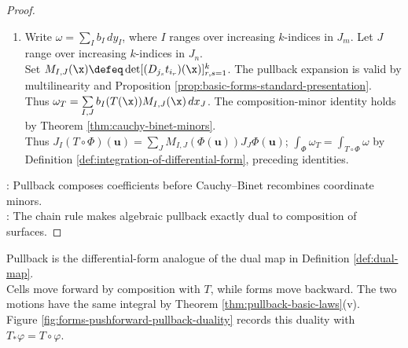 \begin{theorem}
\begin{proof}
\begin{enumerate}[label=(\roman*)]
\item Write $\omega=\sum\limits_I b_I\,dy_I$, where $I$ ranges over increasing $k$-indices in $J_m$. Let $J$ range over increasing $k$-indices in $J_n$.\\
Set $M_{I,J}(\x)\defeq\det[(D_{j_s}t_{i_r})(\x)]_{r,s=1}^{k}$. The pullback expansion is valid by multilinearity and Proposition \ref{prop:basic-forms-standard-presentation}.\\
Thus $\omega_T=\sum\limits_{I,J}b_I(T(\x))M_{I,J}(\x)\,dx_J$. The composition-minor identity holds by Theorem \ref{thm:cauchy-binet-minors}.\\
Thus $J_I(T\circ\Phi)(\mathbf{u})=\sum\limits_JM_{I,J}(\Phi(\mathbf{u}))J_J\Phi(\mathbf{u})$; $\int_{\Phi}\omega_T=\int_{T\circ\Phi}\omega$ by Definition \ref{def:integration-of-differential-form}, preceding identities.
\end{enumerate}
: Pullback composes coefficients before Cauchy--Binet recombines coordinate minors.\\
: The chain rule makes algebraic pullback exactly dual to composition of surfaces.
\end{proof}
\end{theorem}

Pullback is the differential-form analogue of the dual map in Definition \ref{def:dual-map}.\\
Cells move forward by composition with $T$, while forms move backward. The two motions have the same integral by Theorem \ref{thm:pullback-basic-laws}(v).\\
Figure \ref{fig:forms-pushforward-pullback-duality} records this duality with $T_\ast\varphi=T\circ\varphi$.

\begin{illustrationfigure}[H]
  \centering
  
  \caption{Cells push forward with $T$, forms pull back with $T^\ast$, and their integrals agree by Theorem \ref{thm:pullback-basic-laws}(v).}
  \label{fig:forms-pushforward-pullback-duality}
\end{illustrationfigure}
